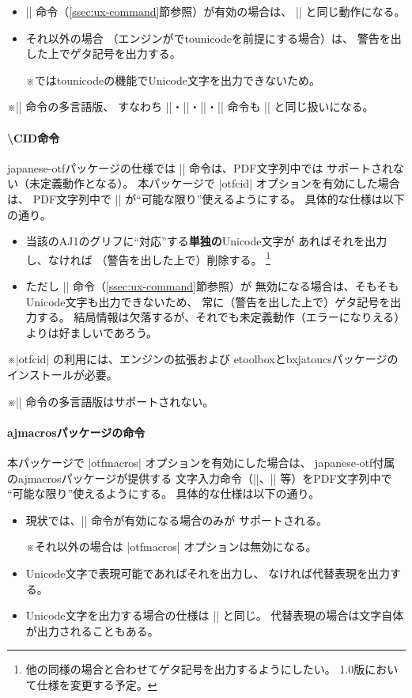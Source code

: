 \documentclass[uplatex,a4paper]{jsarticle}
\newcommand{\Pkg}[1]{\textsf{#1}}
\newcommand{\Note}{\par\noindent ※}
\begin{document}
\begin{itemize}
\item |\Ux| 命令（\ref{ssec:ux-command}節参照）が有効の場合は、
  |\Ux| と同じ動作になる。
\item それ以外の場合
  （エンジンが{\pLaTeX}でtounicodeを前提にする場合）は、
  警告を出した上でゲタ記号を出力する。
  \Note {\pLaTeX}ではtounicodeの機能でUnicode文字を出力できないため。
\end{itemize}

\Note |\UTF| 命令の多言語版、
すなわち |\UTFC|・|\UTFK|・|\UTFM|・|\UTFT| 命令も |\UTF|
と同じ扱いになる。

\paragraph{\textbackslash CID命令}
\Pkg{japanese-otf}パッケージの仕様では |\CID| 命令は、PDF文字列中では
サポートされない（未定義動作となる）。
本パッケージで |otfcid| オプションを有効にした場合は、
PDF文字列中で |\CID| が“可能な限り”使えるようにする。
具体的な仕様は以下の通り。

\begin{itemize}
\item 当該のAJ1のグリフに“対応”する\textbf{単独の}Unicode文字が
  あればそれを出力し、なければ
  （警告を出した上で）削除する。
  \footnote{他の同様の場合と合わせてゲタ記号を出力するようにしたい。
    1.0版において仕様を変更する予定。}
\item ただし |\Ux| 命令（\ref{ssec:ux-command}節参照）が
  無効になる場合は、そもそもUnicode文字も出力できないため、
  常に（警告を出した上で）ゲタ記号を出力する。
  結局情報は欠落するが、それでも未定義動作（エラーになりえる）
  よりは好ましいであろう。
\end{itemize}

\Note |otfcid| の利用には、エンジンの{\eTeX}拡張および
\Pkg{etoolbox}と\Pkg{bxjatoucs}パッケージのインストールが必要。
\Note |\CID| 命令の多言語版はサポートされない。

\paragraph{ajmacrosパッケージの命令}
本パッケージで |otfmacros| オプションを有効にした場合は、
\Pkg{japanese-otf}付属の\Pkg{ajmacros}パッケージが提供する
文字入力命令（|\ajMaru|、|\ajLig| 等）をPDF文字列中で
“可能な限り”使えるようにする。
具体的な仕様は以下の通り。

\begin{itemize}
\item 現状では、|\Ux| 命令が有効になる場合のみが
  サポートされる。
  \Note それ以外の場合は |otfmacros| オプションは無効になる。
\item Unicode文字で表現可能であればそれを出力し、
  なければ代替表現を出力する。
\item Unicode文字を出力する場合の仕様は |\CID| と同じ。
  代替表現の場合は文字自体が出力されることもある。
\end{itemize}
\end{document}
